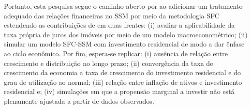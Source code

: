 Portanto, esta pesquisa segue o caminho aberto por \textcite{brochier_supermultiplier_2018} ao adicionar um tratamento adequado das relações financeiras no SSM por meio da metodologia SFC estendendo as contribuições de \textcite{teixeira_crescimento_2015} em duas frentes:
(i) avaliar a aplicabilidade da taxa própria de juros dos imóveis por meio de um modelo macroeconométrico;
(ii) simular um modelo SFC-SSM com investimento residencial de modo a dar ênfase ao ciclo econômico.
Por fim, espera-se replicar:
(i) ausência de relação entre crescimento e distribuição no longo prazo; (ii) convergência
da taxa de crescimento da economia a taxa de crescimento do investimento residencial
e do grau de utilização ao normal; (iii) relação entre inflação de ativos e investimento residencial e; (iv) simulações em que a propensão marginal a investir não está plenamente ajustada a partir de dados observados.
 









